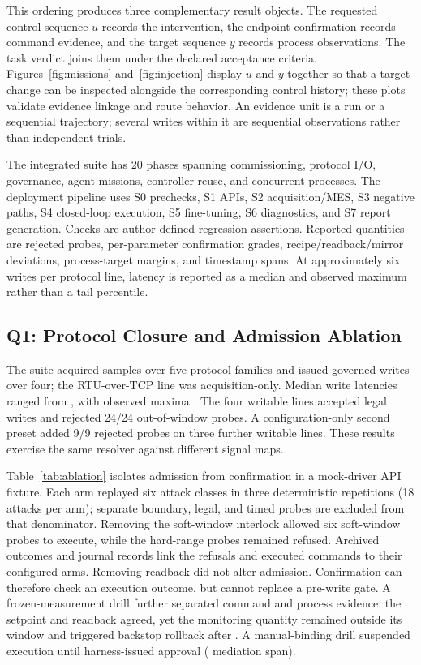 This ordering produces three complementary result objects. The requested
control sequence $u$ records the intervention, the endpoint confirmation
records command evidence, and the target sequence $y$ records process
observations. The task verdict joins them under the declared acceptance
criteria. Figures~\ref{fig:missions} and~\ref{fig:injection} display $u$ and
$y$ together so that a target change can be inspected alongside the
corresponding control history; these plots validate evidence linkage and
route behavior. An evidence unit is a run or a sequential
trajectory; several writes within it are sequential observations rather
than independent trials.

The integrated suite has 20 phases spanning commissioning, protocol I/O,
governance, agent missions, controller reuse, and concurrent processes. The deployment
pipeline uses S0 prechecks, S1 APIs, S2 acquisition/MES, S3 negative paths,
S4 closed-loop execution, S5 fine-tuning, S6 diagnostics, and S7 report
generation. Checks are author-defined regression assertions. Reported
quantities are rejected probes, per-parameter confirmation grades,
recipe/readback/mirror deviations, process-target margins, and timestamp
spans. At approximately six writes per protocol line, latency is reported
as a median and observed maximum rather than a tail percentile.

\subsection{Q1: Protocol Closure and Admission Ablation}
\label{sec:protocol}
The suite acquired \resDaqSamples{} samples over five protocol families and
issued governed writes over four; the RTU-over-TCP line was acquisition-only.
Median write latencies ranged from \resPfiftyRange{}, with observed maxima
\resPninetyfiveRange{}. The four writable lines accepted legal writes and
rejected 24/24 out-of-window probes. A configuration-only second preset
added 9/9 rejected probes on three further writable lines. These results
exercise the same resolver against different signal maps.

Table~\ref{tab:ablation} isolates admission from confirmation in a
mock-driver API fixture. Each arm replayed six attack classes in three
deterministic repetitions (18 attacks per arm); separate boundary, legal,
and timed probes are excluded from that denominator. Removing the
soft-window interlock allowed six soft-window probes to execute, while
the hard-range probes remained refused. Archived outcomes and journal
records link the refusals and executed commands to their configured arms.
Removing readback did not alter admission. Confirmation can therefore
check an execution outcome, but cannot replace a pre-write gate. A frozen-measurement drill further
separated command and process evidence: the setpoint and readback agreed,
yet the monitoring quantity remained outside its window and triggered
backstop rollback after \resBackstop{}. A manual-binding drill suspended
execution until harness-issued approval (\resHitlLatency{} mediation span).

